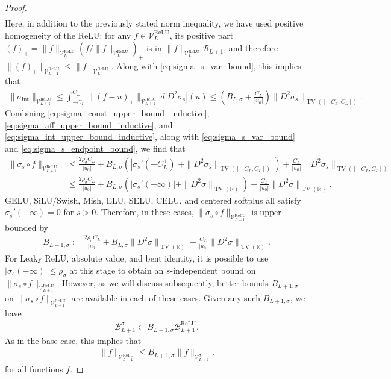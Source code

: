 \documentclass{article}
\DeclareMathOperator{\TV}{TV}
\DeclareMathOperator{\ReLU}{\mathrm{ReLU}}
\def\cB{{\mathcal{B}}}
\def\cV{{\mathcal{V}}}
\newcommand{\R}{\mathbb{R}}
\begin{document}
\begin{appendices}
\begin{proof}
\begin{align}
    \end{align}
    Here, in addition to the previously stated norm inequality, we have used positive homogeneity of the ReLU: for any $f \in \cV_L^{\ReLU}$, its positive part $(f)_+ = \| f \|_{\cV_L^{\ReLU}} (f/\| f \|_{\cV_L^{\ReLU}})_+$ is in $\| f \|_{\cV_L^{\ReLU}} \cB_{L+1}$, and therefore $\| (f)_+ \|_{\cV_{L+1}^{\ReLU}} \leq \| f \|_{\cV_{L}^{\ReLU}}$. Along with \eqref{eq:sigma_s_var_bound}, this implies that
    \begin{align} \label{eq:sigma_int_upper_bound_inductive}
        \| \sigma_{\mathrm{int}} \|_{\cV_{L+1}^{\ReLU}} \leq \int_{-C_L}^{C_L} \| (f - u)_+ \|_{\cV_{L+1}^{\ReLU}} \, d|D^2 \sigma_s|(u) \leq \left( B_{L,\sigma} + \frac{C_L}{|u_0|} \right) \| D^2 \sigma_s \|_{\TV([-C_L, C_L])}. 
    \end{align}
    Combining \eqref{eq:sigma_const_upper_bound_inductive}, \eqref{eq:sigma_aff_upper_bound_inductive}, and \eqref{eq:sigma_int_upper_bound_inductive}, along with \eqref{eq:sigma_s_var_bound} and \eqref{eq:sigma_s_endpoint_bound}, we find that
    \begin{align}
        \| \sigma_s \circ f \|_{\cV_{L+1}^{\ReLU}} &\leq \frac{2 \rho_\sigma C_L}{ |u_0|} + B_{L,\sigma} \left( |\sigma_s'(-C_L^+)| + \| D^2 \sigma_s \|_{\TV([-C_L, C_L])} \right) + \frac{C_L}{|u_0|} \| D^2 \sigma_s \|_{\TV([-C_L, C_L])} \\
        &\leq \frac{2 \rho_\sigma C_L}{ |u_0|} + B_{L,\sigma} \left( |\sigma_s'(-\infty)| + \| D^2 \sigma \|_{\TV(\R)} \right) + \frac{C_L}{|u_0|} \| D^2 \sigma \|_{\TV(\R)}.
    \end{align}
    GELU, SiLU/Swish, Mish, ELU, SELU, CELU, and centered softplus all satisfy $\sigma_s'(-\infty) = 0$ for $s > 0$. Therefore, in these cases, $\| \sigma_s \circ f \|_{\cV_{L+1}^{\ReLU}}$ is upper bounded by
    \begin{align} \label{eq:beta_sigma_inf_0}
        B_{L+1,\sigma} := \frac{2 \rho_\sigma C_L}{ |u_0|} + B_{L,\sigma} \| D^2 \sigma \|_{\TV(\R)}  + \frac{C_L}{|u_0|} \| D^2 \sigma \|_{\TV(\R)}.
    \end{align}
    For Leaky ReLU, absolute value, and bent identity, it is possible to use $|\sigma_s(-\infty)| \leq \rho_\sigma$ at this stage to obtain an $s$-independent bound on $\| \sigma_s \circ f \|_{\cV_{L+1}^{\ReLU}}$. However, as we will discuss subsequently, better bounds $B_{L+1,\sigma}$ on $\| \sigma_s \circ f \|_{\cV_{L+1}^{\ReLU}}$ are available in each of these cases. Given any such $B_{L+1,\sigma}$, we have
    \begin{align}
        \cB_{L+1}^\sigma \subset B_{L+1,\sigma} \cB_{L+1}^{\ReLU}.
    \end{align}
    As in the base case, this implies that
    \begin{align}
        \| f \|_{\cV_{L+1}^{\ReLU}} \leq B_{L+1,\sigma} \| f \|_{\cV_{L+1}^{\sigma}}.
    \end{align}
    for all functions $f$.

\end{proof}
\end{appendices}
\end{document}
